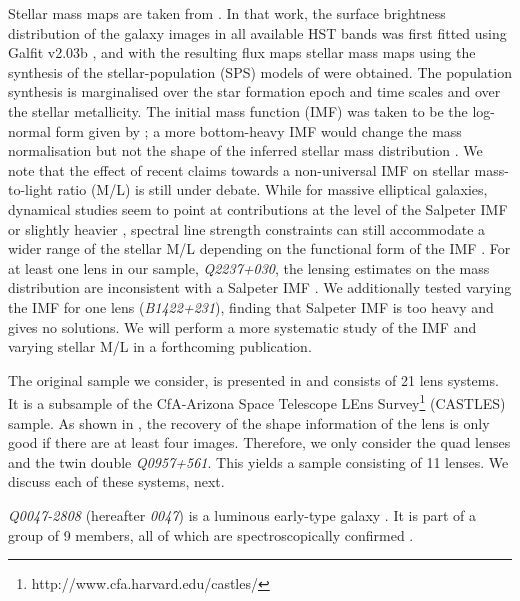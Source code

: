 \documentclass[useAMS,usenatbib]{mn2e}
\begin{document}
Stellar mass maps are taken from \cite{2011ApJ...740...97L}. In that work, the surface brightness distribution of the galaxy images in all available HST bands was first fitted using {\sc Galfit v2.03b} \citep{2002AJ....124..266P}, and with the resulting flux maps stellar mass maps using the synthesis of the stellar-population (SPS) models of \cite{2003MNRAS.344.1000B} were obtained. The population synthesis is marginalised over the star formation epoch and time scales and over the stellar metallicity. The initial mass function (IMF) was taken to be the log-normal form given by \cite{2003PASP..115..763C}; a more bottom-heavy IMF would change the mass normalisation \citep[cf.][]{2014ApJ...793...96S} but not the shape of the inferred stellar mass distribution \citep[unless the IMF presents significant intrinsic deviations locally, see e.g.][]{2015MNRAS.447.1033M}. We note that the effect of recent claims towards a non-universal IMF on stellar mass-to-light ratio (M/L) is still under debate. While for massive elliptical galaxies, dynamical studies seem to point at contributions at the level of the Salpeter IMF or slightly heavier \citep{2013MNRAS.432.1862C}, spectral line strength constraints can still accommodate a wider range of the stellar M/L depending on the functional form of the IMF \citep{2013MNRAS.429L..15F}. For at least one lens in our sample, \textit{Q2237+030}, the lensing estimates on the mass distribution are inconsistent with a Salpeter IMF \citep{2010MNRAS.409L..30F}. We additionally tested varying the IMF for one lens ({\it B1422+231}), finding that Salpeter IMF is too heavy and gives no solutions. We will perform a more systematic study of the IMF and varying stellar M/L in a forthcoming publication.

The original sample we consider, is presented in \cite{2011ApJ...740...97L} and consists of 21 lens systems. It is a subsample of the CfA-Arizona Space Telescope LEns Survey\footnote{http://www.cfa.harvard.edu/castles/} (CASTLES) sample. As shown in \cite{2014MNRAS.445.2181C}, the recovery of the shape information of the lens is only good if there are at least four images. Therefore, we only consider the quad lenses and the twin double \textit{Q0957+561}. This yields a sample consisting of 11 lenses. We discuss each of these systems, next.

\textit{Q0047-2808} (hereafter \textit{0047}) is a luminous early-type galaxy \citep{1996MNRAS.278..139W}. It is part of a group of 9 members, all of which are spectroscopically confirmed \citep{2011ApJ...726...84W}.
\end{document}
